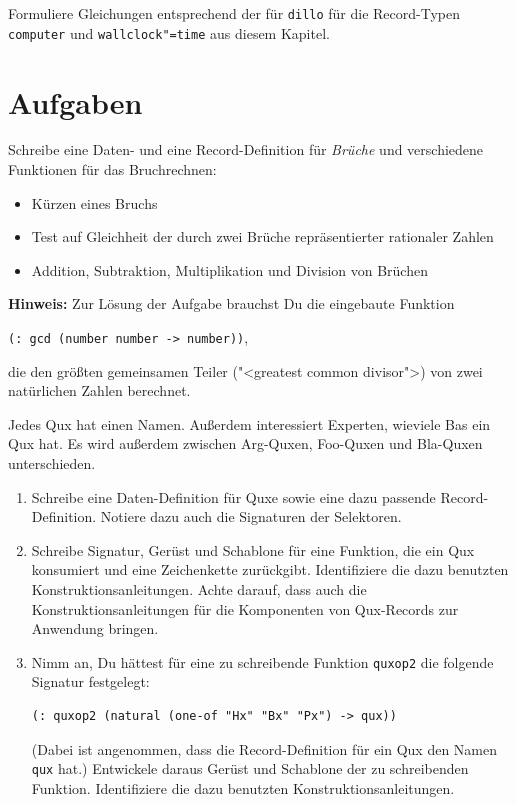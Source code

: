 \begin{aufgabe}
  Formuliere Gleichungen entsprechend der für \texttt{dillo} für die
  Record-Typen \texttt{computer} und \texttt{wallclock"=time} aus
  diesem Kapitel.
\end{aufgabe}

\section*{Aufgaben}

\begin{aufgabe}
  Schreibe eine Daten- und eine
  Record-Definition für \textit{Brüche} und verschiedene Funktionen
  für das Bruchrechnen:
  \begin{itemize}
  \item Kürzen eines Bruchs
  \item Test auf Gleichheit der durch zwei Brüche repräsentierter
    rationaler Zahlen
  \item Addition, Subtraktion, Multiplikation und Division von
    Brüchen
  \end{itemize}
%
  \textbf{Hinweis:} Zur Lösung der Aufgabe brauchst Du die eingebaute
  Funktion
  \begin{center}
    \texttt{(: gcd (number number -> number))},
  \end{center}
  die den größten gemeinsamen Teiler ("<greatest common divisor">) von
  zwei natürlichen Zahlen berechnet.

\end{aufgabe}

\begin{aufgabe}

  Jedes Qux hat einen Namen.  Außerdem interessiert
  Experten, wieviele Bas ein Qux hat.  Es wird außerdem zwischen
  Arg-Quxen, Foo-Quxen und Bla-Quxen unterschieden.
  \begin{enumerate}
  \item Schreibe eine Daten-Definition für Quxe sowie eine dazu
    passende Record-Definition. Notiere dazu auch die Signaturen der
    Selektoren.
  \item Schreibe Signatur, Gerüst und Schablone für eine Funktion,
    die ein Qux konsumiert und eine Zeichenkette zurückgibt.
    Identifiziere die dazu benutzten Konstruktionsanleitungen.
    Achte darauf, dass auch die Konstruktionsanleitungen für die
    Komponenten von Qux-Records zur Anwendung bringen.
  \item Nimm an, Du hättest für eine zu schreibende Funktion
    \texttt{quxop2} die folgende Signatur festgelegt:
\begin{verbatim}
(: quxop2 (natural (one-of "Hx" "Bx" "Px") -> qux))
\end{verbatim}
    (Dabei ist angenommen, dass die Record-Definition für ein Qux
    den Namen \texttt{qux} hat.) Entwickele daraus Gerüst und
    Schablone der zu schreibenden Funktion.  Identifiziere die dazu
    benutzten Konstruktionsanleitungen.
  \end{enumerate}

\end{aufgabe}

